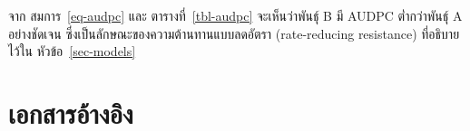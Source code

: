 \documentclass[
  11pt,
  a4paper,
  twoside,
  openright]{scrbook}
\begin{document}
จาก สมการ~\ref{eq-audpc} และ ตารางที่~\ref{tbl-audpc} จะเห็นว่าพันธุ์ B มี AUDPC
ต่ำกว่าพันธุ์ A อย่างชัดเจน ซึ่งเป็นลักษณะของความต้านทานแบบลดอัตรา (rate-reducing
resistance) ที่อธิบายไว้ใน หัวข้อ~\ref{sec-models}


\chapter*{เอกสารอ้างอิง}\label{uxe40uxe2duxe01uxe2auxe32uxe23uxe2duxe32uxe07uxe2duxe07}




\backmatter
\end{document}

